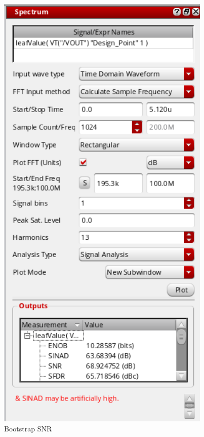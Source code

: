 \documentclass[a4paper,12pt]{article}
\begin{document}
\begin{figure}[H]
    \centering
    \includegraphics[max width = \textwidth]{Flash_ADC_images/Bootstrap_SNR.png}
    \caption{Bootstrap SNR}
    \label{fig:enter-label}
\end{figure}
\end{document}
